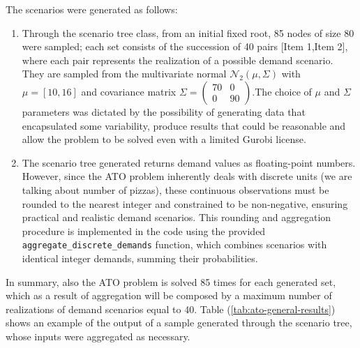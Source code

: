 \documentclass[a4paper,12pt]{article}
\begin{document}
	\noindent The scenarios were generated as follows: 
	\begin{enumerate}
		\item Through the scenario tree class, from an initial fixed root, 85 nodes of size 80 were sampled; each set consists of the succession of 40 pairs [Item 1,Item 2], where each pair represents the realization of a possible demand scenario. They are sampled from the multivariate normal $\mathcal{N}_{2}(\mu, \Sigma)$ with $\mu = [10,16]$ and covariance matrix $\Sigma =  \begin{pmatrix} 70 &0  \\ 0 &90  \end{pmatrix} $.The choice of $\mu$ and $\Sigma$ parameters was dictated by the possibility of generating data that encapsulated some variability, produce results that could be reasonable and allow the problem to be solved even with a limited Gurobi license. 
		
		\item The scenario tree generated returns demand values as floating-point numbers. However, since the ATO problem inherently deals with discrete units (we are talking about number of pizzas), these continuous observations must be rounded to the nearest integer and constrained to be non-negative, ensuring practical and realistic demand scenarios. This rounding and aggregation procedure is implemented in the code using the provided \texttt{aggregate\_discrete\_demands} function, which combines scenarios with identical integer demands, summing their probabilities.
		
	\end{enumerate}
	
	\noindent In summary, also the ATO problem is solved 85 times for each generated set, which as a result of aggregation will be composed by a maximum number of realizations of demand scenarios equal to 40. Table (\ref{tab:ato-general-results}) shows an example of the output of a sample generated through the scenario tree, whose inputs were aggregated as necessary.
\end{document}

